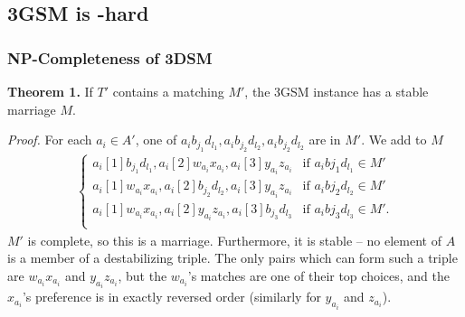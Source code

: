 \documentclass[mathserif,serif]{beamer}
\begin{document}
%


\subsection{3GSM is \NP-hard}

\begin{frame}
  \frametitle{NP-Completeness of 3DSM}
  \textbf{Theorem 1.} If $T'$ contains a matching $M'$, the 3GSM instance has a stable marriage $M$.

  \textit{Proof.} For each $a_i \in A'$, one of $a_ib_{j_1}d_{l_1}, a_ib_{j_2}d_{l_2}, a_ib_{j_2}d_{l_2}$ are in $M'$. We add to $M$
  \begin{align*}
    \begin{cases}
      a_i[1]b_{j_1}d_{l_1}, a_i[2]w_{a_i}x_{a_i}, a_i[3]y_{a_i}z_{a_i} & \text{if } a_ib{j_1}d_{l_1} \in M' \\
      a_i[1]w_{a_i}x_{a_i}, a_i[2]b_{j_2}d_{l_2}, a_i[3]y_{a_i}z_{a_i} & \text{if } a_ib{j_2}d_{l_2} \in M' \\
      a_i[1]w_{a_i}x_{a_i}, a_i[2]y_{a_i}z_{a_i}, a_i[3]b_{j_3}d_{l_3} & \text{if } a_ib{j_3}d_{l_3} \in M'. \\
    \end{cases}
  \end{align*}
  $M'$ is complete, so this is a marriage. Furthermore, it is stable -- no element of $A$ is a member of a destabilizing triple. The only pairs which can form such a triple are $w_{a_i}x_{a_i}$ and $y_{a_i}z_{a_i}$, but the $w_{a_i}$'s matches are one of their top choices, and the $x_{a_i}$'s preference is in exactly reversed order (similarly for $y_{a_i}$ and $z_{a_i}$).
\end{frame}
\end{document}
